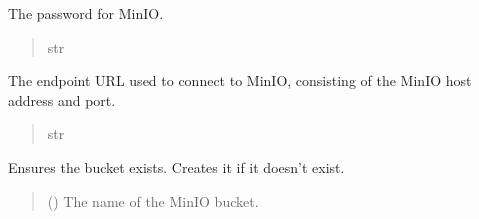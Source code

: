 \documentclass[letterpaper,10pt,english]{sphinxmanual}
\begin{document}
\begin{fulllineitems}
\begin{fulllineitems}
\label{\detokenize{src:src.db_utils.minio.MinioFileSystem.password}}
\pysigstartsignatures
{}
\pysigstopsignatures
\sphinxAtStartPar
The password for MinIO.
\begin{quote}\begin{description}
\sphinxAtStartPar
str

\end{description}\end{quote}

\end{fulllineitems}


\begin{fulllineitems}
\label{\detokenize{src:src.db_utils.minio.MinioFileSystem.endpoint_url}}
\pysigstartsignatures
{}
\pysigstopsignatures
\sphinxAtStartPar
The endpoint URL used to connect to MinIO, consisting of the MinIO host address and port.
\begin{quote}\begin{description}
\sphinxAtStartPar
str

\end{description}\end{quote}

\end{fulllineitems}


\begin{fulllineitems}
\label{\detokenize{src:src.db_utils.minio.MinioFileSystem.create_bucket}}
\pysigstartsignatures
{}
\pysigstopsignatures
\sphinxAtStartPar
Ensures the bucket exists. Creates it if it doesn’t exist.
\begin{quote}\begin{description}
\sphinxAtStartPar
{} () \textendash{} The name of the MinIO bucket.


\end{description}
\end{quote}
\end{fulllineitems}
\end{fulllineitems}
\end{document}
